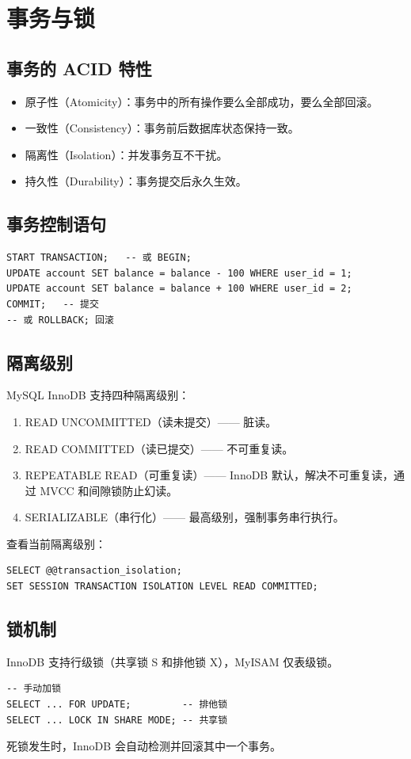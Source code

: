 \documentclass[12pt,UTF8]{ctexbook}
\begin{document}
\chapter{事务与锁}
\label{ch:transaction}

\section{事务的 ACID 特性}
\begin{itemize}
  \item 原子性（Atomicity）：事务中的所有操作要么全部成功，要么全部回滚。
  \item 一致性（Consistency）：事务前后数据库状态保持一致。
  \item 隔离性（Isolation）：并发事务互不干扰。
  \item 持久性（Durability）：事务提交后永久生效。
\end{itemize}

\section{事务控制语句}
\begin{lstlisting}
START TRANSACTION;   -- 或 BEGIN;
UPDATE account SET balance = balance - 100 WHERE user_id = 1;
UPDATE account SET balance = balance + 100 WHERE user_id = 2;
COMMIT;   -- 提交
-- 或 ROLLBACK; 回滚
\end{lstlisting}

\section{隔离级别}
MySQL InnoDB 支持四种隔离级别：
\begin{enumerate}
  \item READ UNCOMMITTED（读未提交）—— 脏读。
  \item READ COMMITTED（读已提交）—— 不可重复读。
  \item REPEATABLE READ（可重复读）—— InnoDB 默认，解决不可重复读，通过 MVCC 和间隙锁防止幻读。
  \item SERIALIZABLE（串行化）—— 最高级别，强制事务串行执行。
\end{enumerate}
查看当前隔离级别：
\begin{lstlisting}
SELECT @@transaction_isolation;
SET SESSION TRANSACTION ISOLATION LEVEL READ COMMITTED;
\end{lstlisting}

\section{锁机制}
InnoDB 支持行级锁（共享锁 S 和排他锁 X），MyISAM 仅表级锁。
\begin{lstlisting}
-- 手动加锁
SELECT ... FOR UPDATE;         -- 排他锁
SELECT ... LOCK IN SHARE MODE; -- 共享锁
\end{lstlisting}
死锁发生时，InnoDB 会自动检测并回滚其中一个事务。
\end{document}
